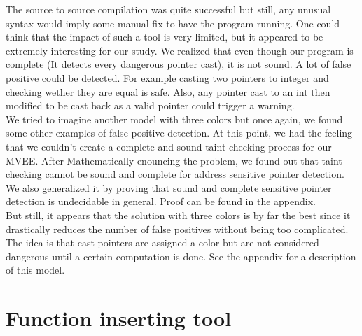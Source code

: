 \documentclass[english]{enstaPRE}
\begin{document}
The source to source compilation was quite successful but still, any unusual syntax would imply some manual fix to have the
program running. One could think that the impact of such a tool is very limited, but it appeared to be extremely interesting for our study.
We realized that even though our program is complete (It detects every dangerous pointer cast), it is not sound.
A lot of false positive could be detected. For example casting two pointers to integer and checking wether they are equal is safe.
Also, any pointer cast to an int then modified to be cast back as a valid pointer could trigger a warning.
\\
We tried to imagine another model with three colors but once again, we found some other examples of false positive detection. At this point, we had the 
feeling that we couldn't create a complete and sound taint checking process for our MVEE. After Mathematically enouncing the problem, we found out 
that taint checking cannot be sound and complete for address sensitive pointer detection. We also generalized it by proving 
that sound and complete sensitive pointer detection is undecidable in general. Proof can be found in the appendix.
\\
But still, it appears that the solution with three colors is by far the best since it drastically reduces the number of false positives without being too
complicated. The idea is that cast pointers are assigned a color but are not considered dangerous until a certain computation is done. See the appendix for 
a description of this model.

\section{Function inserting tool}
\end{document}
